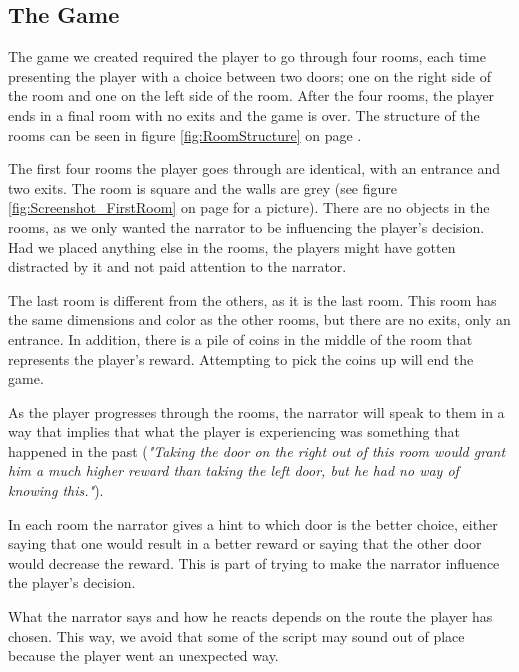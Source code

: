 \subsection{The Game}
\label{Method_Game}

The game we created required the player to go through four rooms, each time presenting the player with a choice between two doors; one on the right side of the room and one on the left side of the room. After the four rooms, the player ends in a final room with no exits and the game is over. The structure of the rooms can be seen in figure \ref{fig:RoomStructure} on page \pageref{fig:RoomStructure}.


The first four rooms the player goes through are identical, with an entrance and two exits. The room is square and the walls are grey (see figure \ref{fig:Screenshot_FirstRoom} on page \pageref{fig:Screenshot_FirstRoom} for a picture). There are no objects in the rooms, as we only wanted the narrator to be influencing the player's decision. Had we placed anything else in the rooms, the players might have gotten distracted by it and not paid attention to the narrator.


The last room is different from the others, as it is the last room. This room has the same dimensions and color as the other rooms, but there are no exits, only an entrance. In addition, there is a pile of coins in the middle of the room that represents the player's reward. Attempting to pick the coins up will end the game.

As the player progresses through the rooms, the narrator will speak to them in a way that implies that what the player is experiencing was something that happened in the past (\textit{"Taking the door on the right out of this room would grant him a much higher reward than taking the left door, but he had no way of knowing this."}).

In each room the narrator gives a hint to which door is the better choice, either saying that one would result in a better reward or saying that the other door would decrease the reward. This is part of trying to make the narrator influence the player's decision.

What the narrator says and how he reacts depends on the route the player has chosen. This way, we avoid that some of the script may sound out of place because the player went an unexpected way.

